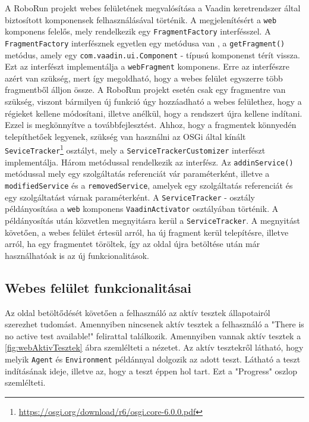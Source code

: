 A RoboRun projekt webes felületének megvalósítása a Vaadin keretrendszer által biztosított komponensek felhasználásával történik. A megjelenítésért a \texttt{web} komponens felelős, mely rendelkezik egy \texttt{FragmentFactory} interfésszel. A \texttt{FragmentFactory} interfésznek egyetlen egy metódusa van , a \texttt{getFragment()} metódus, amely egy \texttt{com.vaadin.ui.Component} - típusú komponenst térít vissza. Ezt az interfészt implementálja a \texttt{webFragment} komponens. Erre az interfészre azért van szükség, mert így megoldható, hogy a webes felület egyszerre több fragmentből álljon össze. A RoboRun projekt esetén csak egy fragmentre van szükség, viszont bármilyen új funkció úgy hozzáadható a webes felülethez, hogy a régieket kellene módosítani, illetve anélkül, hogy a rendszert újra kellene indítani. Ezzel is megkönnyítve a továbbfejlesztést. Ahhoz, hogy a fragmentek könnyedén telepíthetőek legyenek, szükség van használni az OSGi által kínált \texttt{SeviceTracker}\footnote{\href {https://osgi.org/download/r6/osgi.core-6.0.0.pdf}{https://osgi.org/download/r6/osgi.core-6.0.0.pdf}} osztályt, mely a \texttt{ServiceTrackerCustomizer} interfészt implementálja. Három metódussal rendelkezik az interfész. Az \texttt{addinService()} metódussal mely egy szolgáltatás referenciát vár paraméterként, illetve a \texttt{modifiedService} és a \texttt{removedService}, amelyek egy szolgáltatás referenciát és egy szolgáltatást várnak paraméterként. A \texttt{ServiceTracker} - osztály példányosítása a \texttt{web} komponens \texttt{VaadinActivator} osztályában történik. A példányosítás után közvetlen megnyitásra kerül a \texttt{ServiceTracker}. A megnyitást követően, a webes felület értesül arról, ha új fragment kerül telepítésre, illetve arról, ha egy fragmentet töröltek, így az oldal újra betöltése után már használhatóak is az új funkcionalitások.

\subsection{Webes felület funkcionalitásai}\label{subsec:WebesFeluletFunkcioi}
Az oldal betöltődését követően a felhasználó az aktív tesztek állapotairól szerezhet tudomást. Amennyiben nincsenek aktív tesztek a felhasználó a "There is no active test available!" felirattal találkozik. Amennyiben vannak aktív tesztek a \ref{fig:webAktivTesztek} ábra szemlélteti a nézetet. Az aktív tesztekről látható, hogy melyik \texttt{Agent} és \texttt{Environment} példánnyal dolgozik az adott teszt. Látható a teszt indításának ideje, illetve az, hogy a teszt éppen hol tart. Ezt a "Progress" oszlop szemlélteti.

